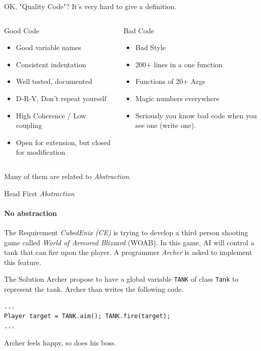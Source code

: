 		\begin{frame}{OK, "Quality Code"?}
			It's very hard to give a definition.
			\begin{columns}
				
				\begin{block}{Good Code}
					\begin{itemize}
						\item Good variable names
						\item Consistent indentation
						\item Well tested, documented
						\item D-R-Y, Don't repeat yourself
						\item High Coherence / Low coupling
						\item Open for extension, but closed for modification
					\end{itemize}
				\end{block}
				\begin{block}{Bad Code}
					\begin{itemize}
						\item Bad Style
						\item 200+ lines in a one function
						\item Functions of 20+ Args
						\item Magic numbers everywhere
						\item Seriously you know bad code when you see one (write one).
					\end{itemize}
				\end{block}
			\end{columns}
			Many of them are related to \emph{Abstraction}.
		\end{frame}
	
\begin{frame}[fragile]{Head First \textit{Abstraction}}
	\framesubtitle{No abstraction}
	\begin{block}{The Requirement}
		\textit{CubedEnix (CE)} is trying to develop a third person shooting game called \textit{World of Armored Blizzard} (WOAB). In this game, AI will control a tank that can fire upon the player. A programmer \textit{Archer} is asked to implement this feature. 
	\end{block}
	\begin{block}{The Solution}
		Archer propose to have a global variable \texttt{TANK} of class \texttt{Tank} to represent the tank. Archer than writes the following code.
\begin{verbatim}
...
Player target = TANK.aim(); TANK.fire(target);
...
\end{verbatim}
		Archer feels happy, so does his boss.
	\end{block}
\end{frame}

